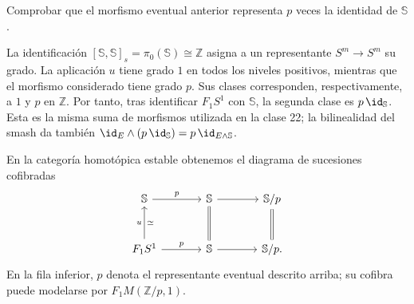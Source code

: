 \begin{ejer}\label{ejer:c23-grado-p}
Comprobar que el morfismo eventual anterior representa $p$ veces la identidad de $\mathbb S$.
\end{ejer}
\begin{sol}
La identificación $[\mathbb S,\mathbb S]_s=\pi_0(\mathbb S)\cong\mathbb Z$ asigna a un representante $S^m\to S^m$ su grado. La aplicación $u$ tiene grado $1$ en todos los niveles positivos, mientras que el morfismo considerado tiene grado $p$. Sus clases corresponden, respectivamente, a $1$ y $p$ en $\mathbb Z$. Por tanto, tras identificar $F_1S^1$ con $\mathbb S$, la segunda clase es $p\,\id_{\mathbb S}$. Esta es la misma suma de morfismos utilizada en la clase 22; la bilinealidad del smash da también $\id_E\wedge(p\,\id_{\mathbb S})=p\,\id_{E\wedge\mathbb S}$.
\end{sol}

En la categoría homotópica estable obtenemos el diagrama de sucesiones cofibradas
\[
\begin{tikzcd}[column sep=large,row sep=large]
\mathbb S\arrow[r,"p"]&\mathbb S\arrow[r]&\mathbb S/p\\
F_1S^1\arrow[u,"u","\simeq"']\arrow[r,"p"]&\mathbb S\arrow[u,equal]\arrow[r]&\mathbb S/p\arrow[u,equal].
\end{tikzcd}
\]
En la fila inferior, $p$ denota el representante eventual descrito arriba; su cofibra puede modelarse por $F_1M(\mathbb Z/p,1)$.

